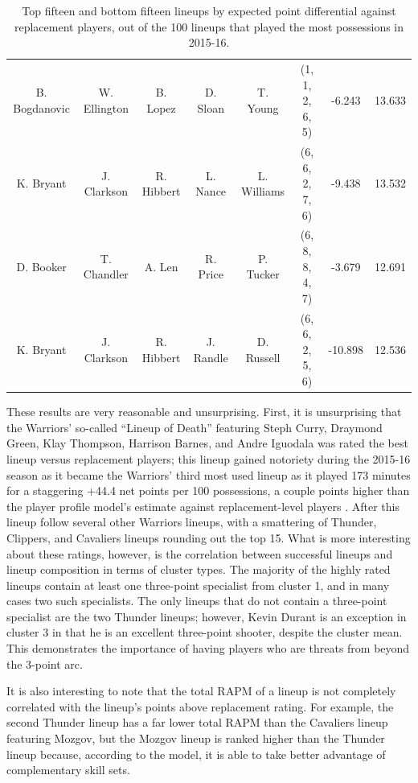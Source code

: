 \begin{table}
{\begin{tabular}{cccccccc}
    B. Bogdanovic &  W. Ellington &      B. Lopez &     D. Sloan &     T. Young &  (1, 1, 2, 6, 5) &      -6.243 &  13.633 \\
        K. Bryant &   J. Clarkson &    R. Hibbert &     L. Nance &  L. Williams &  (6, 6, 2, 7, 6) &      -9.438 &  13.532 \\
        D. Booker &   T. Chandler &        A. Len &     R. Price &    P. Tucker &  (6, 8, 8, 4, 7) &      -3.679 &  12.691 \\
        K. Bryant &   J. Clarkson &    R. Hibbert &    J. Randle &   D. Russell &  (6, 6, 2, 5, 6) &     -10.898 &  12.536 \\
\bottomrule
        \end{tabular}
    }
    \caption{Top fifteen and bottom fifteen lineups by expected point differential
    against replacement players, out of the 100 lineups that played the most
    possessions in 2015-16.}
    \label{tab:lineup_ratings}
\end{table}

These results are very reasonable and unsurprising. First, it is unsurprising that
the Warriors' so-called ``Lineup of Death'' featuring Steph Curry, Draymond Green,
Klay Thompson, Harrison Barnes, and Andre Iguodala was rated the best lineup versus
replacement players; this lineup gained notoriety during the 2015-16 season as it
became the Warriors' third most used lineup as it played 173 minutes for a
staggering +44.4 net points per 100 possessions, a couple points higher than the
player profile model's estimate against replacement-level players \cite{Ringer,
BKRef}.  After this lineup follow several other Warriors lineups, with a smattering
of Thunder, Clippers, and Cavaliers lineups rounding out the top 15. What is more
interesting about these ratings, however, is the correlation between successful
lineups and lineup composition in terms of cluster types. The majority of the highly
rated lineups contain at least one three-point specialist from cluster 1, and in
many cases two such specialists. The only lineups that do not contain a three-point
specialist are the two Thunder lineups; however, Kevin Durant is an exception in
cluster 3 in that he is an excellent three-point shooter, despite the cluster mean.
This demonstrates the importance of having players who are threats from beyond the
3-point arc.

It is also interesting to note that the total RAPM of a lineup is not completely
correlated with the lineup's points above replacement rating. For example, the
second Thunder lineup has a far lower total RAPM than the Cavaliers lineup
featuring Mozgov, but the Mozgov lineup is ranked higher than the Thunder lineup
because, according to the model, it is able to take better advantage of
complementary skill sets.

